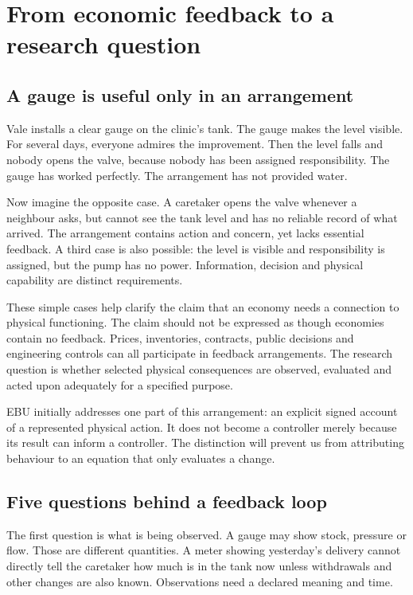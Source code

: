 \chapter{From economic feedback to a research question}\label{ch:research}

\section{A gauge is useful only in an arrangement}
Vale installs a clear gauge on the clinic's tank. The gauge makes the level visible. For several days, everyone admires the improvement. Then the level falls and nobody opens the valve, because nobody has been assigned responsibility. The gauge has worked perfectly. The arrangement has not provided water.

Now imagine the opposite case. A caretaker opens the valve whenever a neighbour asks, but cannot see the tank level and has no reliable record of what arrived. The arrangement contains action and concern, yet lacks essential feedback. A third case is also possible: the level is visible and responsibility is assigned, but the pump has no power. Information, decision and physical capability are distinct requirements.

These simple cases help clarify the claim that an economy needs a connection to physical functioning. The claim should not be expressed as though economies contain no feedback. Prices, inventories, contracts, public decisions and engineering controls can all participate in feedback arrangements. The research question is whether selected physical consequences are observed, evaluated and acted upon adequately for a specified purpose.

EBU initially addresses one part of this arrangement: an explicit signed account of a represented physical action. It does not become a controller merely because its result can inform a controller. The distinction will prevent us from attributing behaviour to an equation that only evaluates a change.

\section{Five questions behind a feedback loop}
The first question is what is being observed. A gauge may show stock, pressure or flow. Those are different quantities. A meter showing yesterday's delivery cannot directly tell the caretaker how much is in the tank now unless withdrawals and other changes are also known. Observations need a declared meaning and time.

